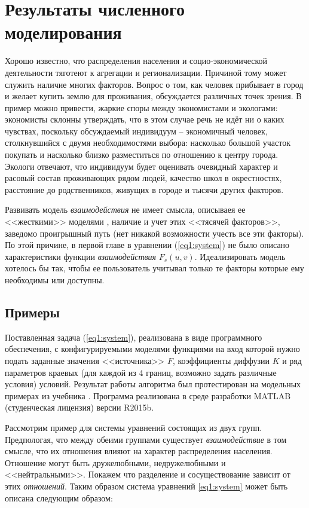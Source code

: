 \chapter{Результаты численного моделирования} \label{ch3:results}

Хорошо известно, что распределения населения и социо-экономической деятельности тяготеют к агрегации и регионализации. Причиной тому может служить наличие многих факторов. Вопрос о том, как человек прибывает в город и желает купить землю для проживания, обсуждается различных точек зрения. В пример можно привести, жаркие споры между экономистами и экологами: экономисты склонны утверждать, что в этом случае речь не идёт ни о каких чувствах, поскольку обсуждаемый индивидуум – экономичный человек, столкнувшийся с двумя необходимостями выбора: насколько большой участок покупать и насколько близко разместиться по отношению к центру города. Экологи отвечают, что индивидуум будет оценивать очевидный характер и расовый состав проживающих рядом людей, качество школ в окрестностях, расстояние до родственников, живущих в городе и тысячи других факторов. 

Развивать модель \textit{взаимодействия} не имеет смысла, описываея ее <<жесткими>> моделями \cite{Arnold}, наличие и учет этих <<тясячей факторов>>, заведомо проигрышный путь (нет никакой возможности учесть все эти факторы). По этой причине, в первой главе в уравнении (\ref{eq1:system}) не было описано характеристики функции \textit{взаимодействия} $F_{s}(u,v)$. Идеализировать модель хотелось бы так, чтобы ее пользователь учитывал только те факторы которые ему необходимы или доступны.

\section{Примеры}
Поставленная задача (\ref{eq1:system}), реализована в виде программного обеспечения, с конфигурируемыми моделями функциями  
на вход которой нужно подать заданные значения <<источника>> $F$, коэффициенты диффузии $K$ и ряд параметров краевых (для каждой из 4 границ, возможно задать различные условия) условий. Результат работы алгоритма был протестирован на модельных примерах из учебника \cite{Samarskiy1987}. Программа реализована в среде разработки MATLAB (студенческая лицензия) версии R2015b.

Рассмотрим пример для системы уравнений состоящих из двух групп. Предпологая, что между обеими группами существует \textit{взаимодействие} в том смысле, что их отношения влияют на характер распределения населения. Отношение могут быть дружелюбными, недружелюбными и <<нейтральными>>. Покажем что разделение и сосуществование зависит от этих \textit{отношений}. Таким образом система уравнений \ref{eq1:system} может быть описана следующим образом:

